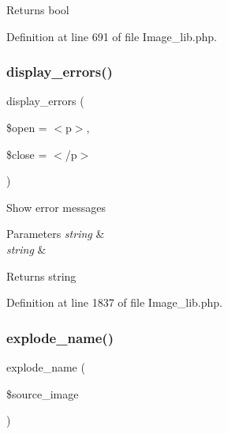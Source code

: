 \begin{DoxyReturn}{Returns}
bool 
\end{DoxyReturn}


Definition at line 691 of file Image\+\_\+lib.\+php.

\mbox{\label{class_c_i___image__lib_a71a6f2e6d97ff5347257f101002bc903}} 
\subsubsection{\texorpdfstring{display\_errors()}{display\_errors()}}
{\footnotesize\ttfamily display\+\_\+errors (\begin{DoxyParamCaption}\item[{}]{\$open = {\ttfamily \textquotesingle{}$<$p$>$\textquotesingle{}},  }\item[{}]{\$close = {\ttfamily \textquotesingle{}$<$/p$>$\textquotesingle{}} }\end{DoxyParamCaption})}

Show error messages


\begin{DoxyParams}{Parameters}
{\em string} & \\
\hline
{\em string} & \\
\hline
\end{DoxyParams}
\begin{DoxyReturn}{Returns}
string 
\end{DoxyReturn}


Definition at line 1837 of file Image\+\_\+lib.\+php.

\mbox{\label{class_c_i___image__lib_a32661288e0bea18ea50fbb7be6535af5}} 
\subsubsection{\texorpdfstring{explode\_name()}{explode\_name()}}
{\footnotesize\ttfamily explode\+\_\+name (\begin{DoxyParamCaption}\item[{}]{\$source\+\_\+image }\end{DoxyParamCaption})}

